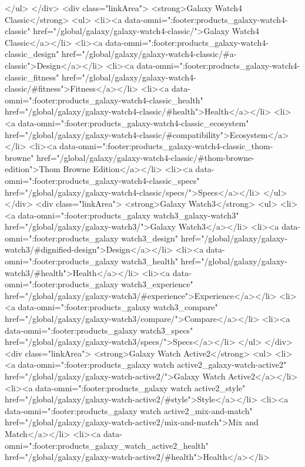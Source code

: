 {{{{{{{{{{{{{{{{{{{{{{{{{{{{{{{{{{{{{{{{{{{{{{{{{{{{{			</ul>
		</div>
		<div class="linkArea">
			<strong>Galaxy Watch4 Classic</strong>
			<ul>
				<li><a data-omni=":footer:products_galaxy-watch4-classic" href="/global/galaxy/galaxy-watch4-classic/">Galaxy Watch4 Classic</a></li>
				<li><a data-omni=":footer:products_galaxy-watch4-classic_design" href="/global/galaxy/galaxy-watch4-classic/#a-classic">Design</a></li>
				<li><a data-omni=":footer:products_galaxy-watch4-classic_fitness" href="/global/galaxy/galaxy-watch4-classic/#fitness">Fitness</a></li>
				<li><a data-omni=":footer:products_galaxy-watch4-classic_health" href="/global/galaxy/galaxy-watch4-classic/#health">Health</a></li>
				<li><a data-omni=":footer:products_galaxy-watch4-classic_ecosystem" href="/global/galaxy/galaxy-watch4-classic/#compatibility">Ecosystem</a></li>
				<li><a data-omni=":footer:products_galaxy-watch4-classic_thom-browne" href="/global/galaxy/galaxy-watch4-classic/#thom-browne-edition">Thom Browne Edition</a></li>
				<li><a data-omni=":footer:products_galaxy-watch4-classic_specs" href="/global/galaxy/galaxy-watch4-classic/specs/">Specs</a></li>
			</ul>
		</div>
		<div class="linkArea">
			<strong>Galaxy Watch3</strong>
			<ul>
				<li><a data-omni=":footer:products_galaxy watch3_galaxy-watch3" href="/global/galaxy/galaxy-watch3/">Galaxy Watch3</a></li>
				<li><a data-omni=":footer:products_galaxy watch3_design" href="/global/galaxy/galaxy-watch3/#dignified-design">Design</a></li>
				<li><a data-omni=":footer:products_galaxy watch3_health" href="/global/galaxy/galaxy-watch3/#health">Health</a></li>
				<li><a data-omni=":footer:products_galaxy watch3_experience" href="/global/galaxy/galaxy-watch3/#experience">Experience</a></li>
				<li><a data-omni=":footer:products_galaxy watch3_compare" href="/global/galaxy/galaxy-watch3/compare/">Compare</a></li>
				<li><a data-omni=":footer:products_galaxy watch3_specs" href="/global/galaxy/galaxy-watch3/specs/">Specs</a></li>
			</ul>
		</div>
		<div class="linkArea">
			<strong>Galaxy Watch Active2</strong>
			<ul>
				<li><a data-omni=":footer:products_galaxy watch active2_galaxy-watch-active2" href="/global/galaxy/galaxy-watch-active2/">Galaxy Watch Active2</a></li>
				<li><a data-omni=":footer:products_galaxy watch active2_style" href="/global/galaxy/galaxy-watch-active2/#style">Style</a></li>
				<li><a data-omni=":footer:products_galaxy watch active2_mix-and-match" href="/global/galaxy/galaxy-watch-active2/mix-and-match">Mix and Match</a></li>
				<li><a data-omni=":footer:products_galaxy_watch_active2_health" href="/global/galaxy/galaxy-watch-active2/#health">Health</a></li>
}}}}}}}}}}}}}}}}}}}}}}}}}}}}}}}}}}}}}}}}}}}}}}}}}}}}}
